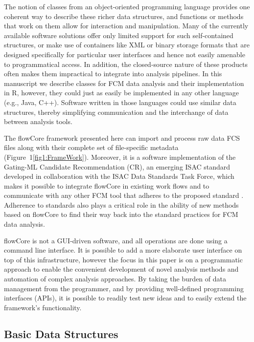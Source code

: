 \documentclass[10pt]{bmc_article}
\newcommand{\Rpackage}[1]{{\textsf{#1}}}
\newenvironment{bmcformat}{\begin{raggedright}\baselineskip20pt\sloppy\setboolean{publ}{false}}{\end{raggedright}\baselineskip20pt\sloppy}
\begin{document}
\begin{bmcformat}
The notion of classes from an object-oriented programming language
provides one coherent way to describe these richer data structures,
and functions or methods that work on them allow for interaction and
manipulation. Many of the currently available software solutions offer
only limited support for such self-contained structures, or make use
of containers like XML or binary storage formats that are designed
specifically for particular user interfaces and hence not easily
amenable to programmatical access. In addition, the closed-source
nature of these products often makes them impractical to integrate
into analysis pipelines. In this manuscript we describe classes for
FCM data analysis and their implementation in R, however, they could
just as easily be implemented in any other language (e.g., Java,
C++). Software written in those languages could use similar data
structures, thereby simplifying communication and the interchange of
data between analysis tools.

The \Rpackage{flowCore} framework presented here can import and
process raw data FCS files along with their complete set of
file-specific metadata (Figure~1\ref{fig1:FrameWork}).  Moreover, it is
a software implementation of the Gating-ML Candidate Recommendation
(CR), an emerging ISAC standard developed in collaboration with the
ISAC Data Standards Task Force, which makes it possible to integrate
\Rpackage{flowCore} in existing work flows and to communicate with any
other FCM tool that adheres to the proposed standard
\cite{SpidlenInPressCytometryA}. Adherence to standards also plays a
critical role in the ability of new methods based on
\Rpackage{flowCore} to find their way back into the standard practices
for FCM data analysis.

\Rpackage{flowCore} is not a GUI-driven software, and all operations
are done using a command line interface.  It is possible to add a more
elaborate user interface on top of this infrastructure, however the
focus in this paper is on a programmatic approach to enable the
convenient development of novel analysis methods and automation of
complex analysis approaches.  By taking the burden of data management
from the programmer, and by providing well-defined programming
interfaces (APIs), it is possible to readily test new ideas and to
easily extend the framework's functionality.

\subsection*{Basic Data Structures}

\end{bmcformat}
\end{document}
